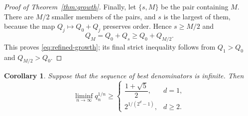 \documentclass[11pt,reqno]{amsart}
\newtheorem{corollary}[theorem]{Corollary}
\theoremstyle{definition}
\newcommand{\0}{\mbf 0}%
\begin{document}
\begin{proof}[Proof of Theorem~\ref{thm:growth}]
Finally, let $\{s,M\}$ be the pair containing $M$. There are $M/2$ smaller
members of the pairs, and $s$ is the largest of them, because the map
$Q_j\mapsto Q_0+Q_j$ preserves order. Hence $s\ge M/2$ and
$$
 Q_M=Q_0+Q_s\ge Q_0+Q_{M/2}.
$$
This proves \eqref{eq:refined-growth}; its final strict inequality follows
from $Q_1>Q_0$ and $Q_{M/2}>Q_0$.
\end{proof}

\begin{corollary}\label{cor:growth-rate}
Suppose that the sequence of best denominators is infinite. Then
$$
 \liminf_{n\to\infty}q_n^{1/n}\ge
 \begin{cases}
  \dfrac{1+\sqrt5}{2},&d=1,\\
  2^{1/(2^d-1)},&d\ge2.
 \end{cases}
$$
\end{corollary}
\end{document}
